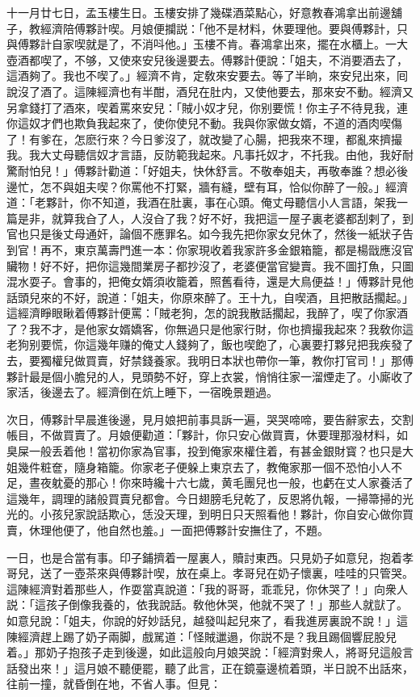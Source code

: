 十一月廿七日，孟玉樓生日。玉樓安排了幾碟酒菜點心，好意教春鴻拿出前邊舖子，教經濟陪傅夥計喫。月娘便攔説：「他不是材料，休要理他。要與傅夥計，只與傅夥計自家喫就是了，不消呌他。」玉樓不肯。春鴻拿出來，擺在水櫃上。一大壺酒都喫了，不够，又使來安兒後邊要去。傅夥計便說：「姐夫，不消要酒去了，這酒夠了。我也不喫了。」經濟不肯，定敎來安要去。等了半晌，來安兒出來，囘說沒了酒了。這陳經濟也有半酣，酒兒在肚内，又使他要去，那來安不動。經濟又另拿錢打了酒來，喫着罵來安兒：「賊小奴才兒，你别要慌！你主子不待見我，連你這奴才們也欺負我起來了，使你使兒不動。我與你家做女婿，不道的酒肉喫傷了！有爹在，怎麽行來？今日爹沒了，就改變了心腸，把我來不理，都亂來擠撮我。我大丈母聽信奴才言語，反防範我起來。凡事托奴才，不托我。由他，我好耐驚耐怕兒！」傅夥計勸道：「好姐夫，快休舒言。不敬奉姐夫，再敬奉誰？想必後邊忙，怎不與姐夫喫？你罵他不打緊，牆有縫，壁有耳，恰似你醉了一般。」經濟道：「老夥計，你不知道，我酒在肚裏，事在心頭。俺丈母聽信小人言語，架我一篇是非，就算我㒲了人，人沒㒲了我？好不好，我把這一屋子裏老婆都刮剌了，到官也只是後丈母通奸，論個不應罪名。如今我先把你家女兒休了，然後一紙狀子告到官！再不，東京萬壽門進一本：你家現收着我家許多金銀箱籠，都是楊戩應沒官贜物！好不好，把你這幾間業房子都抄沒了，老婆便當官變賣。我不圖打魚，只圖混水耍子。會事的，把俺女婿須收籠着，照舊看待，還是大鳥便益！」傅夥計見他話頭兒來的不好，說道：「姐夫，你原來醉了。王十九，自喫酒，且把散話擱起。」這經濟睜眼瞅着傅夥計便罵：「賊老狗，怎的說我散話擱起，我醉了，喫了你家酒了？我不才，是他家女婿嬌客，你無過只是他家行財，你也擠撮我起來？我敎你這老狗别要慌，你這幾年赚的俺丈人錢夠了，飯也喫飽了，心裏要打夥兒把我疾發了去，要獨權兒做買賣，好禁錢養家。我明日本狀也帶你一筆，教你打官司！」那傅夥計最是個小膽兒的人，見頭勢不好，穿上衣裳，悄悄往家一溜煙走了。小廝收了家活，後邊去了。經濟倒在炕上睡下，一宿晚景題過。

次日，傅夥計早晨進後邊，見月娘把前事具訴一遍，哭哭啼啼，要告辭家去，交割帳目，不做買賣了。月娘便勸道：「夥計，你只安心做買賣，休要理那潑材料，如臭屎一般丢着他！當初你家為官事，投到俺家來權住着，有甚金銀財寳？也只是大姐幾件粧奩，隨身箱籠。你家老子便躲上東京去了，教俺家那一個不恐怕小人不足，晝夜躭憂的那心！你來時纔十六七歲，黄毛團兒也一般，也虧在丈人家養活了這幾年，調理的諸般買賣兒都會。今日翅膀毛兒乾了，反恩將仇報，一掃箒掃的光光的。小孩兒家說話欺心，恁没天理，到明日只天照看他！夥計，你自安心做你買賣，休理他便了，他自然也羞。」一面把傅夥計安撫住了，不題。

一日，也是合當有事。印子鋪擠着一屋裏人，贖討東西。只見奶子如意兒，抱着孝哥兒，送了一壺茶來與傅夥計喫，放在桌上。孝哥兒在奶子懷裏，哇哇的只管哭。這陳經濟對着那些人，作耍當真說道：「我的哥哥，乖乖兒，你休哭了！」向衆人説：「這孩子倒像我養的，依我說話。敎他休哭，他就不哭了！」那些人就獃了。如意兒說：「姐夫，你說的好妙話兒，越發叫起兒來了，看我進房裏說不說！」這陳經濟趕上踢了奶子兩脚，戲駡道：「怪賊邋遢，你説不是？我且踢個響屁股兒着。」那奶子抱孩子走到後邊，如此這般向月娘哭說：「經濟對衆人，將哥兒這般言話發出來！」這月娘不聽便罷，聽了此言，正在鏡臺邊梳着頭，半日說不出話來，往前一撞，就昏倒在地，不省人事。但見：

